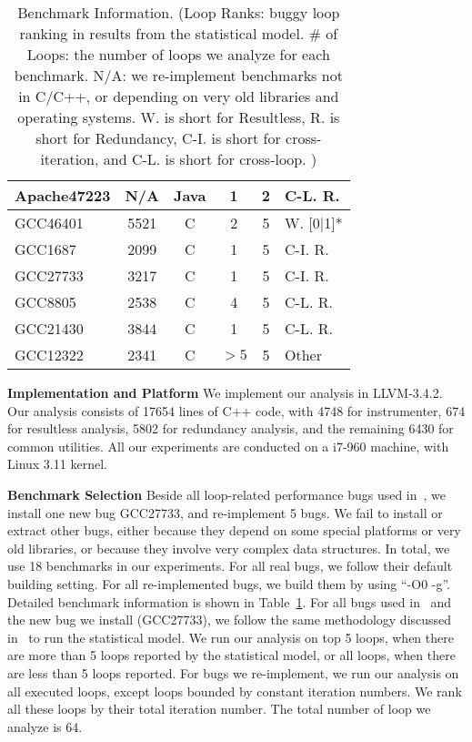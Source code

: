 \begin{table}
\begin{tabular}{lccccl}
   Apache47223      & N/A          & Java                   & 1               & 2               &  C-L. R. \\
   \midrule
   GCC46401         & 5521         & C                      & 2               &   5             &  W. [0$|$1]*   \\
   GCC1687          & 2099         & C                      & 1               &   5             &  C-I. R. \\
   GCC27733         & 3217         & C                      & 1               &   5             &  C-I. R. \\
   GCC8805          & 2538         & C                      & 4               &   5             &  C-L. R.\\
   GCC21430         & 3844         & C                      & 1               &   5             &  C-L. R. \\
   GCC12322         & 2341         & C                      & $>5$            &   5             &  Other\\
\bottomrule
   \end{tabular}
  \caption{Benchmark Information. (Loop Ranks: buggy loop ranking in results from the statistical model.
  \# of Loops: the number of loops we analyze for each benchmark. 
  N/A: we re-implement benchmarks not in C/C++, or depending on very old libraries and operating systems. 
  W. is short for Resultless, R. is short for Redundancy, C-I. is short for cross-iteration, and C-L. is short for cross-loop. )}
  \label{tab:6_benchmarks}
\end{table}

{\bf Implementation and Platform}
We implement our analysis in LLVM-3.4.2. 
Our analysis consists of 17654 lines of C++ code, 
with 4748 for instrumenter, 674 for resultless analysis, 
5802 for redundancy analysis, 
and the remaining 6430 for common utilities. 
All our experiments are conducted on a i7-960 machine, with Linux 3.11 kernel. 

{\bf Benchmark Selection}
Beside all loop-related performance bugs used in~\cite{SongOOPSLA2014}, 
we install one new bug GCC27733, and re-implement 5 bugs. 
We fail to install or extract other bugs, 
either because they depend on some special platforms or very old libraries, 
or because they involve very complex data structures. 
In total, we use 18 benchmarks in our experiments. 
For all real bugs, we follow their default building setting. For all re-implemented bugs,
we build them by using ``-O0 -g''. 
Detailed benchmark information is shown in Table~\ref{tab:6_benchmarks}. 
For all bugs used in~\cite{SongOOPSLA2014} and the new bug we install (GCC27733), 
we follow the same methodology discussed in~\cite{SongOOPSLA2014} to run the statistical model. 
We run our analysis on top 5 loops, 
when there are more than 5 loops reported by the statistical model, 
or all loops, when there are less than 5 loops reported. 
For bugs we re-implement, we run our analysis on all executed loops, 
except loops bounded by constant iteration numbers.
We rank all these loops by their total iteration number. 
The total number of loop we analyze is 64.   

